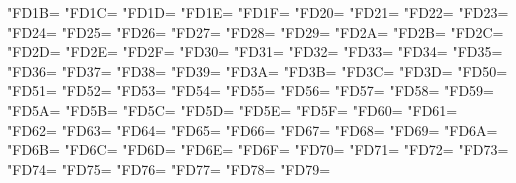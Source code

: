 \XeTeXcharclass"FD1B=\KclassArabU
\XeTeXcharclass"FD1C=\KclassArabU
\XeTeXcharclass"FD1D=\KclassArabU
\XeTeXcharclass"FD1E=\KclassArabU
\XeTeXcharclass"FD1F=\KclassArabU
\XeTeXcharclass"FD20=\KclassArabU
\XeTeXcharclass"FD21=\KclassArabU
\XeTeXcharclass"FD22=\KclassArabU
\XeTeXcharclass"FD23=\KclassArabU
\XeTeXcharclass"FD24=\KclassArabU
\XeTeXcharclass"FD25=\KclassArabU
\XeTeXcharclass"FD26=\KclassArabU
\XeTeXcharclass"FD27=\KclassArabU
\XeTeXcharclass"FD28=\KclassArabU
\XeTeXcharclass"FD29=\KclassArabU
\XeTeXcharclass"FD2A=\KclassArabU
\XeTeXcharclass"FD2B=\KclassArabU
\XeTeXcharclass"FD2C=\KclassArabU
\XeTeXcharclass"FD2D=\KclassArabU
\XeTeXcharclass"FD2E=\KclassArabU
\XeTeXcharclass"FD2F=\KclassArabU
\XeTeXcharclass"FD30=\KclassArabU
\XeTeXcharclass"FD31=\KclassArabU
\XeTeXcharclass"FD32=\KclassArabU
\XeTeXcharclass"FD33=\KclassArabU
\XeTeXcharclass"FD34=\KclassArabU
\XeTeXcharclass"FD35=\KclassArabU
\XeTeXcharclass"FD36=\KclassArabU
\XeTeXcharclass"FD37=\KclassArabU
\XeTeXcharclass"FD38=\KclassArabU
\XeTeXcharclass"FD39=\KclassArabU
\XeTeXcharclass"FD3A=\KclassArabU
\XeTeXcharclass"FD3B=\KclassArabU
\XeTeXcharclass"FD3C=\KclassArabU
\XeTeXcharclass"FD3D=\KclassArabU
\XeTeXcharclass"FD50=\KclassArabU
\XeTeXcharclass"FD51=\KclassArabU
\XeTeXcharclass"FD52=\KclassArabU
\XeTeXcharclass"FD53=\KclassArabU
\XeTeXcharclass"FD54=\KclassArabU
\XeTeXcharclass"FD55=\KclassArabU
\XeTeXcharclass"FD56=\KclassArabU
\XeTeXcharclass"FD57=\KclassArabU
\XeTeXcharclass"FD58=\KclassArabU
\XeTeXcharclass"FD59=\KclassArabU
\XeTeXcharclass"FD5A=\KclassArabU
\XeTeXcharclass"FD5B=\KclassArabU
\XeTeXcharclass"FD5C=\KclassArabU
\XeTeXcharclass"FD5D=\KclassArabU
\XeTeXcharclass"FD5E=\KclassArabU
\XeTeXcharclass"FD5F=\KclassArabU
\XeTeXcharclass"FD60=\KclassArabU
\XeTeXcharclass"FD61=\KclassArabU
\XeTeXcharclass"FD62=\KclassArabU
\XeTeXcharclass"FD63=\KclassArabU
\XeTeXcharclass"FD64=\KclassArabU
\XeTeXcharclass"FD65=\KclassArabU
\XeTeXcharclass"FD66=\KclassArabU
\XeTeXcharclass"FD67=\KclassArabU
\XeTeXcharclass"FD68=\KclassArabU
\XeTeXcharclass"FD69=\KclassArabU
\XeTeXcharclass"FD6A=\KclassArabU
\XeTeXcharclass"FD6B=\KclassArabU
\XeTeXcharclass"FD6C=\KclassArabU
\XeTeXcharclass"FD6D=\KclassArabU
\XeTeXcharclass"FD6E=\KclassArabU
\XeTeXcharclass"FD6F=\KclassArabU
\XeTeXcharclass"FD70=\KclassArabU
\XeTeXcharclass"FD71=\KclassArabU
\XeTeXcharclass"FD72=\KclassArabU
\XeTeXcharclass"FD73=\KclassArabU
\XeTeXcharclass"FD74=\KclassArabU
\XeTeXcharclass"FD75=\KclassArabU
\XeTeXcharclass"FD76=\KclassArabU
\XeTeXcharclass"FD77=\KclassArabU
\XeTeXcharclass"FD78=\KclassArabU
\XeTeXcharclass"FD79=\KclassArabU
